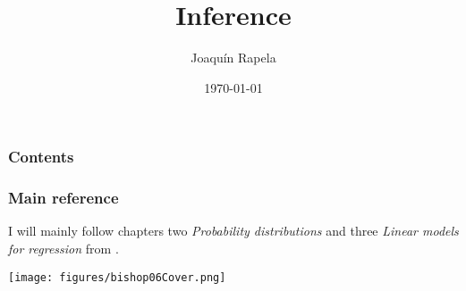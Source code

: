 \documentclass[11pt]{beamer}
\title{Inference}
\author{Joaqu\'{i}n Rapela} %
\institute[GCNU, UCL] %
{
Gatsby Computational Neuroscience Unit\\University College London %
}
\date{\today} %
\begin{document}
\begin{frame}
\titlepage %
\end{frame}

\begin{frame}
\frametitle{Contents} %
\tableofcontents %
\end{frame}

\begin{frame}
\frametitle{Main reference} %

    I will mainly follow chapters two \textit{Probability distributions} and
    three \textit{Linear models for regression} from
    \citet{bishop06}.

    \begin{center}
        \texttt{[image: figures/bishop06Cover.png]}
    \end{center}

\end{frame}

\begin{comment}
\begin{frame}
\frametitle{Main lecture goals}

    \begin{figure}
        \begin{tikzpicture}
            \node[ellipse,align=center,anchor=north,fill=blue!20,draw=blue] (foundations) {Mathematical\\foundations\\of probability};
            \node[ellipse,align=center,anchor=north,fill=orange!20,draw=orange] [below left=of foundations] (proofs) {Proofs\\(beautiful)};
            \node[ellipse,align=center,anchor=north,fill=orange!20,draw=orange] [below=of foundations] (examples) {Examples\\(fun)};
            \node[ellipse,align=center,anchor=north,fill=orange!20,draw=orange] [below right=of foundations] (simulations) {Simulations\\(useful)};
            \path[-] (foundations) edge node [] {} (proofs);
            \path[-] (foundations) edge node [] {} (examples);
            \path[-] (foundations) edge node [] {} (simulations);
        \end{tikzpicture}
    \end{figure }

\end{frame}
\end{comment}
\end{document}
